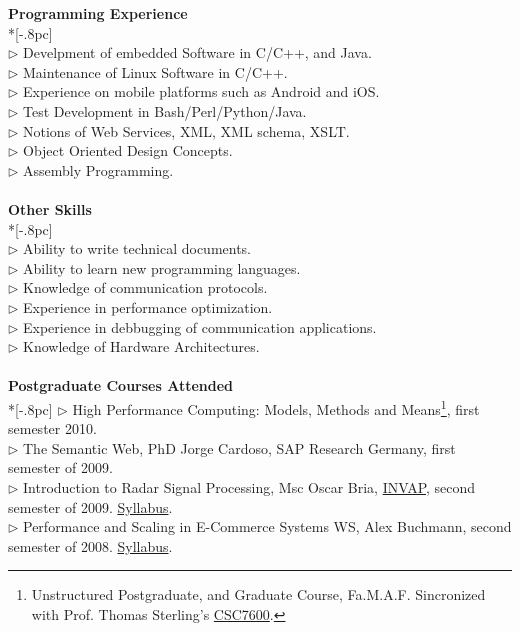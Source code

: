\documentclass[a4paper,11pt,english]{article}
\begin{document}
{
{\large \bf Programming Experience} \\*[-.8pc]
\underline{\hspace{6in}} \\
$\triangleright$ Develpment of embedded Software in C/C++, and Java.\\
$\triangleright$ Maintenance of Linux Software in C/C++.\\
$\triangleright$ Experience on mobile platforms such as Android and iOS.\\
$\triangleright$ Test Development in Bash/Perl/Python/Java.\\
$\triangleright$ Notions of Web Services, XML, XML schema, XSLT.\\
$\triangleright$ Object Oriented Design Concepts.\\
$\triangleright$ Assembly Programming.\\
\\

{\large \bf Other Skills} \\*[-.8pc]
\underline{\hspace{6in}} \\
$\triangleright$ Ability to write technical documents.\\
$\triangleright$ Ability to learn new programming languages.\\
$\triangleright$ Knowledge of communication protocols.\\
$\triangleright$ Experience in performance optimization.\\
$\triangleright$ Experience in debbugging of communication applications.\\
$\triangleright$ Knowledge of Hardware Architectures.\\
 }
 \\
{\large \bf Postgraduate Courses Attended}\\ *[-.8pc]
\underline{\hspace{6in}} 
$\triangleright$ High Performance Computing: Models, Methods and Means\footnote{Unstructured Postgraduate,
and Graduate Course, Fa.M.A.F. Sincronized with Prof. Thomas Sterling's 
\href{http://www.cct.lsu.edu/csc7600/Home.html}{CSC7600}.}, first semester 2010.\\
$\triangleright$ The Semantic Web, PhD Jorge Cardoso, SAP Research Germany, first semester of 2009.\\
$\triangleright$ Introduction to Radar Signal Processing, Msc Oscar Bria, 
\href{http://www.invap.net/index-e.php}{INVAP}, second semester of 2009. \href{http://postgrado.info.unlp.edu.ar/Carrera/Programas/Contenidos_IPSR.pdf}{Syllabus}.\\
$\triangleright$ Performance and Scaling in E-Commerce Systems WS, Alex Buchmann, second semester of 2008. 
\href{http://www.dvs.tu-darmstadt.de/teaching/perf/2008/}{Syllabus}.\\
\end{document}
